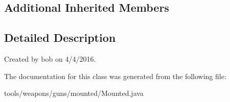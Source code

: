 \subsection*{Additional Inherited Members}


\subsection{Detailed Description}
Created by bob on 4/4/2016. 

The documentation for this class was generated from the following file\+:\begin{DoxyCompactItemize}
\item 
tools/weapons/guns/mounted/Mounted.\+java\end{DoxyCompactItemize}

